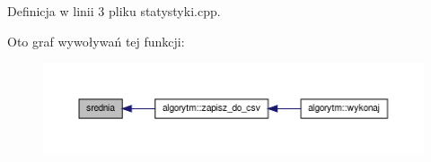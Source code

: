 \-Definicja w linii 3 pliku statystyki.\-cpp.



\-Oto graf wywoływań tej funkcji\-:
\nopagebreak
\begin{figure}[H]
\begin{center}
\leavevmode
\includegraphics[width=350pt]{statystyki_8hh_a978b972ebd4a834c47800d668ba8ecf2_icgraph}
\end{center}
\end{figure}


